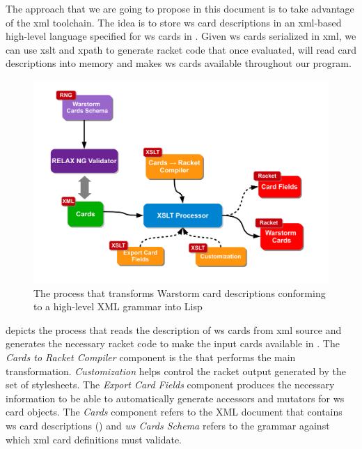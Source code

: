 \documentclass[10pt,oneside,a4paper]{skh-scrreprt}
\begin{document}
The approach that we are going
to propose in this document
is to take advantage of the \gls{xml} toolchain.
The idea is to store \gls{ws} card 
descriptions in an \gls{xml}-based 
high-level language specified for
\gls{ws} cards in .
Given \gls{ws} cards serialized in \gls{xml},
we can use \gls{xslt} 
and \gls{xpath}
to generate 
\gls{racket} code 
that once evaluated, 
will read card descriptions 
into memory and makes \gls{ws} cards 
available throughout our program.

\begin{figure}[h]\label{fig:cards-to-racket}
\caption[Transform Warstorm Card Descriptions from XML into Lisp]{%
The process that transforms Warstorm card descriptions conforming
to a high-level XML grammar into Lisp}
\includegraphics[width=14cm]{fig/cards-to-racket}
\end{figure}

 depicts 
the process that reads the description
of \gls{ws} cards from \gls{xml} source
and generates the necessary \gls{racket}
code to make the input cards
available in .
The \emph{Cards to Racket Compiler}
component is the 
that performs the main transformation.
\emph{Customization} helps control
the \gls{racket} output generated by the
set of stylesheets.
The \emph{Export Card Fields} component
produces the necessary information
to be able to automatically
generate accessors and mutators
for \gls{ws} card objects.
The \emph{Cards} component refers to
the XML document that contains
\gls{ws} card descriptions
()
and \emph{\gls{ws} Cards Schema}
refers to the grammar against
which \gls{xml} card definitions
must validate.
\end{document}
